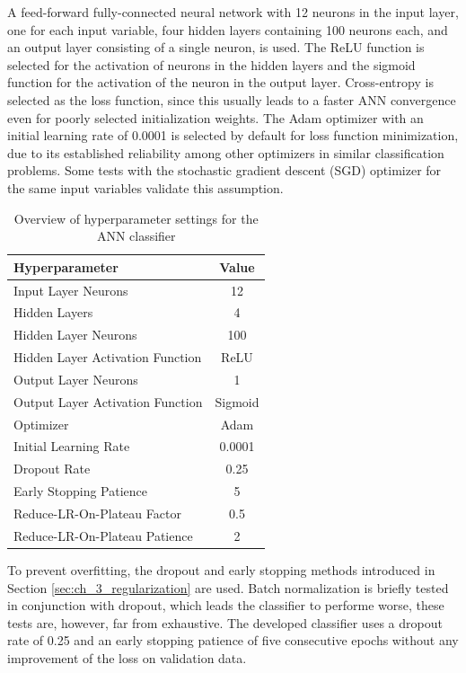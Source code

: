 A feed-forward fully-connected neural network with 12 neurons in the input layer, one for each input variable, four hidden layers containing 100 neurons each, and an output layer consisting of a single neuron, is used. The ReLU function is selected for the activation of neurons in the hidden layers and the sigmoid function for the activation of the neuron in the output layer. Cross-entropy is selected as the loss function, since this usually leads to a faster ANN convergence even for poorly selected initialization weights. The Adam optimizer with an initial learning rate of 0.0001 is selected by default for loss function minimization, due to its established reliability among other optimizers in similar classification problems. Some tests with the stochastic gradient descent (SGD) optimizer for the same input variables validate this assumption.

\begin{table}[h]
    \caption{Overview of hyperparameter settings for the ANN classifier}
    \label{tab:ch_4_ann_topology}
    \begin{center}
        \begin{tabular}{lc}
            \hline
            Hyperparameter & Value\\
            \hline
            Input Layer Neurons & 12\\
            Hidden Layers & 4\\
            Hidden Layer Neurons & 100\\
            Hidden Layer Activation Function & ReLU\\
            Output Layer Neurons & 1\\
            Output Layer Activation Function & Sigmoid\\
            Optimizer & Adam\\
            Initial Learning Rate & 0.0001\\
            Dropout Rate & 0.25\\
            Early Stopping Patience & 5\\
            Reduce-LR-On-Plateau Factor & 0.5\\
            Reduce-LR-On-Plateau Patience & 2\\
            \hline
        \end{tabular}
    \end{center}
\end{table}

To prevent overfitting, the dropout and early stopping methods introduced in Section \ref{sec:ch_3_regularization} are used. Batch normalization is briefly tested in conjunction with dropout, which leads the classifier to performe worse, these tests are, however, far from exhaustive. The developed classifier uses a dropout rate of 0.25 and an early stopping patience of five consecutive epochs without any improvement of the loss on validation data.

